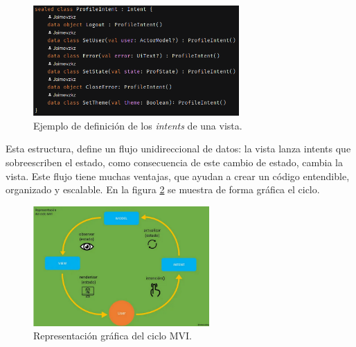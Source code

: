\begin{itemize}
    \begin{figure}[h]
        \centering
        \includegraphics[width = 0.7\textwidth]{Imagenes/Fuentes/ejemplo_intent.png}
        \caption{Ejemplo de definición de los \textit{intents} de una vista.}
        \label{fig:ejemplo_intent}
    \end{figure}
\end{itemize}

Esta estructura, define un flujo unidireccional de datos: la vista lanza intents que sobreescriben el estado, como consecuencia de este cambio de estado, cambia la vista. Este flujo tiene muchas ventajas, que ayudan a crear un código entendible, organizado y escalable. En la figura \ref{fig:visualMvi}\hyperlink{cap:biblio}{} se muestra de forma gráfica el ciclo.
\begin{figure}[h]
    \centering
    \includegraphics[width = 0.6\textwidth]{Imagenes/Fuentes/visual_mvi.png}
    \caption{Representación gráfica del ciclo MVI.}
    \label{fig:visualMvi}
\end{figure}


